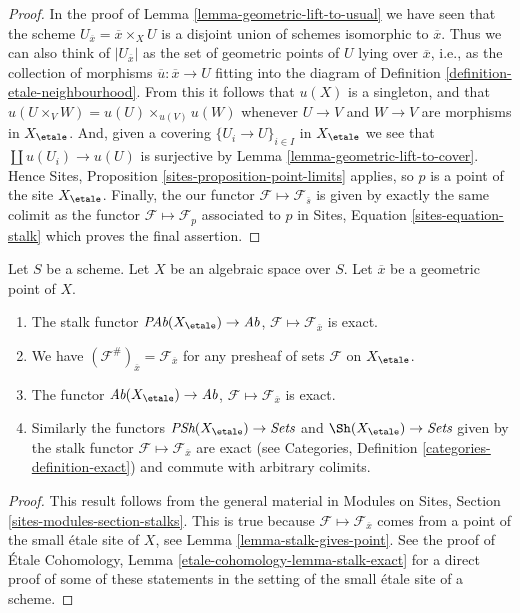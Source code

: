 \begin{proof}
In the proof of
Lemma \ref{lemma-geometric-lift-to-usual}
we have seen that the scheme $U_{\overline{x}} = \overline{x} \times_X U$
is a disjoint union of
schemes isomorphic to $\overline{x}$. Thus we can also think of
$|U_{\overline{x}}|$ as the set of geometric points of $U$ lying over
$\overline{x}$, i.e., as the collection of morphisms
$\overline{u} : \overline{x} \to U$ fitting into the diagram of
Definition \ref{definition-etale-neighbourhood}.
From this it follows that $u(X)$ is a singleton, and that
$u(U \times_V W) = u(U) \times_{u(V)} u(W)$
whenever $U \to V$ and $W \to V$ are morphisms in $X_\etale$.
And, given a covering $\{U_i \to U\}_{i \in I}$ in $X_\etale$ we see
that $\coprod u(U_i) \to u(U)$ is surjective by
Lemma \ref{lemma-geometric-lift-to-cover}.
Hence
Sites, Proposition \ref{sites-proposition-point-limits}
applies, so $p$ is a point of the site $X_\etale$.
Finally, the our functor $\mathcal{F} \mapsto \mathcal{F}_{\overline{s}}$
is given by exactly the same colimit as the functor
$\mathcal{F} \mapsto \mathcal{F}_p$ associated to $p$ in
Sites, Equation \ref{sites-equation-stalk}
which proves the final assertion.
\end{proof}

\begin{lemma}
\label{lemma-stalk-exact}
Let $S$ be a scheme.
Let $X$ be an algebraic space over $S$.
Let $\overline{x}$ be a geometric point of $X$.
\begin{enumerate}
\item The stalk functor
$\textit{PAb}(X_\etale) \to \textit{Ab}$,
$\mathcal{F}  \mapsto  \mathcal{F}_{\overline{x}}$
is exact.
\item We have $(\mathcal{F}^\#)_{\overline{x}} = \mathcal{F}_{\overline{x}}$
for any presheaf of sets $\mathcal{F}$ on $X_\etale$.
\item The functor
$\textit{Ab}(X_\etale) \to \textit{Ab}$,
$\mathcal{F} \mapsto \mathcal{F}_{\overline{x}}$ is exact.
\item Similarly the functors
$\textit{PSh}(X_\etale) \to \textit{Sets}$ and
$\Sh(X_\etale) \to \textit{Sets}$ given by the stalk functor
$\mathcal{F} \mapsto \mathcal{F}_{\overline{x}}$ are exact (see
Categories, Definition \ref{categories-definition-exact})
and commute with arbitrary colimits.
\end{enumerate}
\end{lemma}

\begin{proof}
This result follows from the general material in
Modules on Sites, Section \ref{sites-modules-section-stalks}.
This is true because $\mathcal{F} \mapsto \mathcal{F}_{\overline{x}}$
comes from a point of the small \'etale site of $X$, see
Lemma \ref{lemma-stalk-gives-point}. See the proof of
\'Etale Cohomology, Lemma \ref{etale-cohomology-lemma-stalk-exact}
for a direct proof of some of these statements in the setting of
the small \'etale site of a scheme.
\end{proof}

